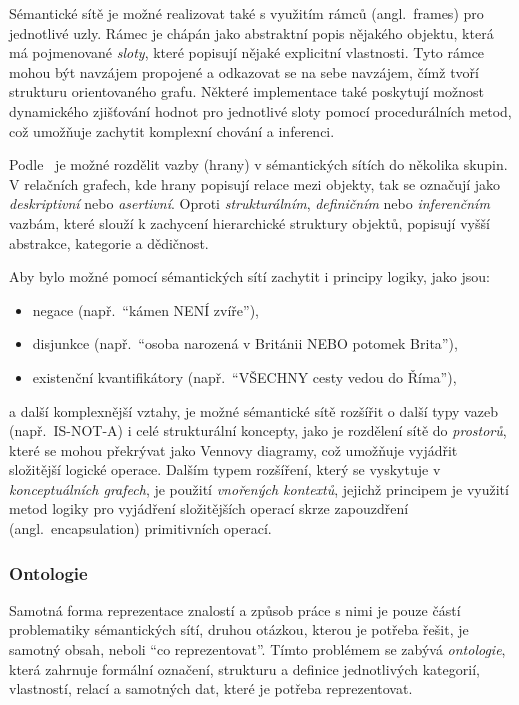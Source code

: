 Sémantické sítě je možné realizovat také s využitím rámců (angl.~frames) pro jednotlivé uzly.
Rámec je chápán jako abstraktní popis nějakého objektu, která má pojmenované \emph{sloty}, které popisují nějaké explicitní vlastnosti.
Tyto rámce mohou být navzájem propojené a odkazovat se na sebe navzájem, čímž tvoří strukturu orientovaného grafu.
Některé implementace také poskytují možnost dynamického zjišťování hodnot pro jednotlivé sloty pomocí procedurálních metod,
což umožňuje zachytit komplexní chování a inferenci.~\cite{semantic-nets-LEHMANN19921}

Podle~\cite{semantic-nets-LEHMANN19921} je možné rozdělit vazby (hrany) v sémantických sítích do několika skupin.
V relačních grafech, kde hrany popisují relace mezi objekty, tak se označují jako \emph{deskriptivní} nebo \emph{asertivní}.
Oproti \emph{strukturálním}, \emph{definičním} nebo \emph{inferenčním} vazbám, které slouží k zachycení hierarchické struktury objektů,
popisují vyšší abstrakce, kategorie a dědičnost.~\cite{semantic-nets-LEHMANN19921}

Aby bylo možné pomocí sémantických sítí zachytit i principy logiky, jako jsou:
\begin{itemize}
	\item negace (např.~\enquote{kámen NENÍ zvíře}),
	\item disjunkce (např.~\enquote{osoba narozená v Británii NEBO potomek Brita}),
	\item existenční kvantifikátory (např.~\enquote{VŠECHNY cesty vedou do Říma}),
\end{itemize}
a další komplexnější vztahy, je možné sémantické sítě rozšířit o další typy vazeb (např.~IS-NOT-A) i celé strukturální koncepty,
jako je rozdělení sítě do \emph{prostorů}, které se mohou překrývat jako Vennovy diagramy, což umožňuje vyjádřit složitější logické operace.
Dalším typem rozšíření, který se vyskytuje v \emph{konceptuálních grafech}, je použití \emph{vnořených kontextů},
jejichž principem je využití metod logiky pro vyjádření složitějších operací skrze zapouzdření (angl.~encapsulation) primitivních operací.~\cite{semantic-nets-LEHMANN19921}

\subsubsection{Ontologie}
Samotná forma reprezentace znalostí a způsob práce s nimi je pouze částí problematiky sémantických sítí,
druhou otázkou, kterou je potřeba řešit, je samotný obsah, neboli \enquote{co reprezentovat}.
Tímto problémem se zabývá \emph{ontologie}, která zahrnuje formální označení, strukturu a definice jednotlivých kategorií,
vlastností, relací a samotných dat, které je potřeba reprezentovat.

